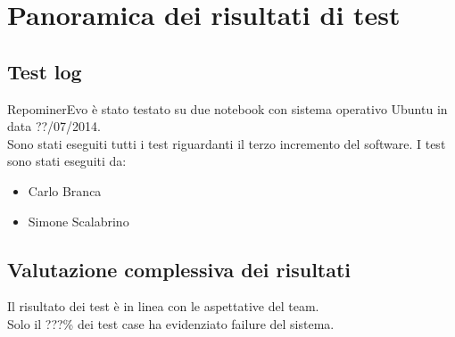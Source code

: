 \chapter{Panoramica dei risultati di test}

\section{Test log}

RepominerEvo è stato testato su due notebook con sistema operativo Ubuntu in data ??/07/2014.\\
Sono stati eseguiti tutti i test riguardanti il terzo incremento del software.
I test sono stati eseguiti da:
\begin{itemize}
\item Carlo Branca
\item Simone Scalabrino
\end{itemize}

\section{Valutazione complessiva dei risultati}

Il risultato dei test è in linea con le aspettative del team.\\
Solo il ???\% dei test case ha evidenziato failure del sistema.\\

\clearpage